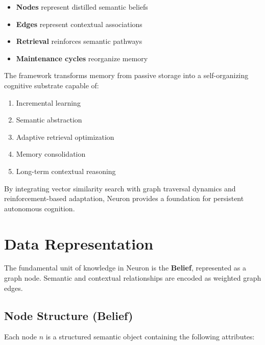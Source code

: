 \documentclass[11pt,a4paper]{article}
\begin{document}
\begin{itemize}
    \item \textbf{Nodes} represent distilled semantic beliefs
    \item \textbf{Edges} represent contextual associations
    \item \textbf{Retrieval} reinforces semantic pathways
    \item \textbf{Maintenance cycles} reorganize memory
\end{itemize}

The framework transforms memory from passive storage into a self-organizing cognitive
substrate capable of:

\begin{enumerate}
    \item Incremental learning
    \item Semantic abstraction
    \item Adaptive retrieval optimization
    \item Memory consolidation
    \item Long-term contextual reasoning
\end{enumerate}

By integrating vector similarity search with graph traversal dynamics and
reinforcement-based adaptation, Neuron provides a foundation for persistent autonomous
cognition.

\section{Data Representation}

The fundamental unit of knowledge in Neuron is the \textbf{Belief}, represented as a
graph node. Semantic and contextual relationships are encoded as weighted graph edges.

\subsection{Node Structure (Belief)}

Each node $n$ is a structured semantic object containing the following attributes:
\end{document}
